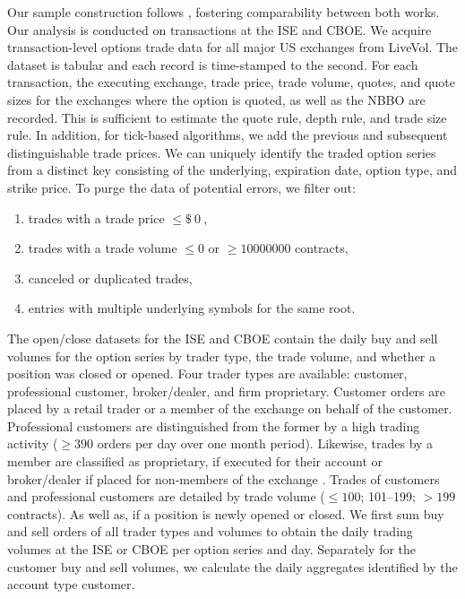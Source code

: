 Our sample construction follows \textcite[][7--9]{grauerOptionTradeClassification2022}, fostering comparability between both works. Our analysis is conducted on transactions at the \gls{ISE} and \gls{CBOE}. We acquire transaction-level options trade data for all major US exchanges from LiveVol. The dataset is tabular and each record is time-stamped to the second. For each transaction, the executing exchange, trade price, trade volume, quotes, and quote sizes for the exchanges where the option is quoted, as well as the \gls{NBBO} are recorded. This is sufficient to estimate the quote rule, depth rule, and trade size rule. In addition, for tick-based algorithms, we add the previous and subsequent distinguishable trade prices. We can uniquely identify the traded option series from a distinct key consisting of the underlying, expiration date, option type, and strike price. To purge the data of potential errors, we filter out:
\begin{enumerate}[label=(\roman*),noitemsep]
    \item trades with a trade price $\leq \SI{0}[\$]{}$,
    \item trades with a trade volume $\leq 0$ or $\ge \num{10000000}$ contracts,
    \item canceled or duplicated trades,
    \item entries with multiple underlying symbols for the same root.
\end{enumerate}


The open/close datasets for the \gls{ISE} and \gls{CBOE} contain the daily buy and sell volumes for the option series by trader type, the trade volume, and whether a position was closed or opened. Four trader types are available: customer, professional customer, broker/dealer, and firm proprietary. Customer orders are placed by a retail trader or a member of the exchange on behalf of the customer. Professional customers are distinguished from the former by a high trading activity ($\geq390$ orders per day over one month period). Likewise, trades by a member are classified as proprietary, if executed for their account or broker/dealer if placed for non-members of the exchange \autocite[][2]{nasdaqincFrequentlyAskedQuestions2017}. Trades of customers and professional customers are detailed by trade volume ($\leq 100$; 101--199; $> 199$ contracts). As well as, if a position is newly opened or closed. We first sum buy and sell orders of all trader types and volumes to obtain the daily trading volumes at the \gls{ISE} or \gls{CBOE} per option series and day. Separately for the customer buy and sell volumes, we calculate the daily aggregates identified by the account type customer.

